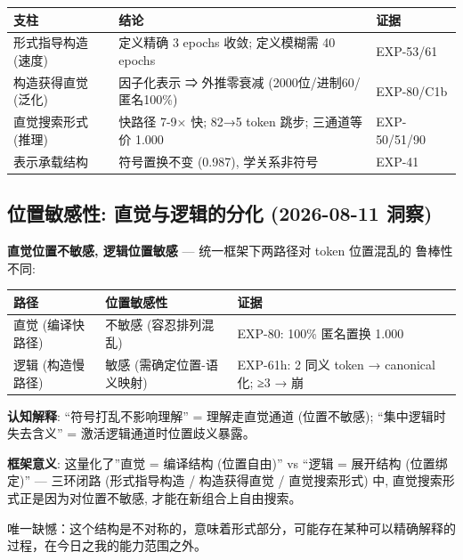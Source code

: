 \documentclass[
]{article}
\begin{document}
\begin{longtable}[]{@{}
  >{\raggedright\arraybackslash}p{}
  >{\raggedright\arraybackslash}p{}
  >{\raggedright\arraybackslash}p{}@{}}
\toprule\noalign{}
\begin{minipage}[b]{\linewidth}\raggedright
支柱
\end{minipage} & \begin{minipage}[b]{\linewidth}\raggedright
结论
\end{minipage} & \begin{minipage}[b]{\linewidth}\raggedright
证据
\end{minipage} \\
\midrule\noalign{}
\endhead
\bottomrule\noalign{}
\endlastfoot
形式指导构造 (速度) & 定义精确 3 epochs 收敛; 定义模糊需 40 epochs &
EXP-53/61 \\
构造获得直觉 (泛化) & 因子化表示 ⇒ 外推零衰减 (2000位/进制60/匿名100\%)
& EXP-80/C1b \\
直觉搜索形式 (推理) & 快路径 7-9× 快; 82→5 token 跳步; 三通道等价 1.000
& EXP-50/51/90 \\
表示承载结构 & 符号置换不变 (0.987), 学关系非符号 & EXP-41 \\
\end{longtable}

\subsection{位置敏感性: 直觉与逻辑的分化 (2026-08-11
洞察)}\label{ux4f4dux7f6eux654fux611fux6027-ux76f4ux89c9ux4e0eux903bux8f91ux7684ux5206ux5316-2026-08-11-ux6d1eux5bdf}

\textbf{直觉位置不敏感, 逻辑位置敏感} --- 统一框架下两路径对 token
位置混乱的 鲁棒性不同:

\begin{longtable}[]{@{}
  >{\raggedright\arraybackslash}p{}
  >{\raggedright\arraybackslash}p{}
  >{\raggedright\arraybackslash}p{}@{}}
\toprule\noalign{}
\begin{minipage}[b]{\linewidth}\raggedright
路径
\end{minipage} & \begin{minipage}[b]{\linewidth}\raggedright
位置敏感性
\end{minipage} & \begin{minipage}[b]{\linewidth}\raggedright
证据
\end{minipage} \\
\midrule\noalign{}
\endhead
\bottomrule\noalign{}
\endlastfoot
直觉 (编译快路径) & 不敏感 (容忍排列混乱) & EXP-80: 100\% 匿名置换
1.000 \\
逻辑 (构造慢路径) & 敏感 (需确定位置-语义映射) & EXP-61h: 2 同义 token →
canonical 化; ≥3 → 崩 \\
\end{longtable}

\textbf{认知解释}: ``符号打乱不影响理解'' = 理解走直觉通道 (位置不敏感);
``集中逻辑时失去含义'' = 激活逻辑通道时位置歧义暴露。

\textbf{框架意义}: 这量化了''直觉 = 编译结构 (位置自由)'' vs ``逻辑 =
展开结构 (位置绑定)'' --- 三环闭路 (形式指导构造 / 构造获得直觉 /
直觉搜索形式) 中, 直觉搜索形式正是因为对位置不敏感,
才能在新组合上自由搜索。

唯一缺憾：这个结构是不对称的，意味着形式部分，可能存在某种可以精确解释的过程，在今日之我的能力范围之外。
\end{document}
